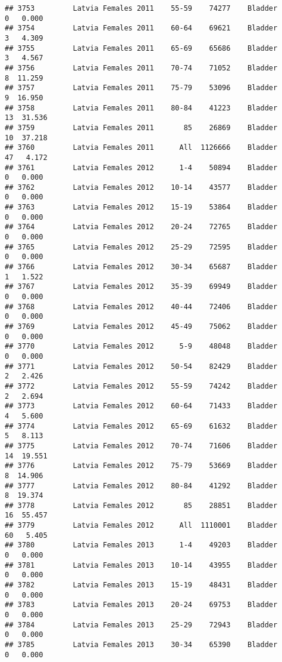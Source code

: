 \documentclass[
]{article}
\begin{document}
\begin{verbatim}
## 3753         Latvia Females 2011    55-59    74277    Bladder      0   0.000
## 3754         Latvia Females 2011    60-64    69621    Bladder      3   4.309
## 3755         Latvia Females 2011    65-69    65686    Bladder      3   4.567
## 3756         Latvia Females 2011    70-74    71052    Bladder      8  11.259
## 3757         Latvia Females 2011    75-79    53096    Bladder      9  16.950
## 3758         Latvia Females 2011    80-84    41223    Bladder     13  31.536
## 3759         Latvia Females 2011       85    26869    Bladder     10  37.218
## 3760         Latvia Females 2011      All  1126666    Bladder     47   4.172
## 3761         Latvia Females 2012      1-4    50894    Bladder      0   0.000
## 3762         Latvia Females 2012    10-14    43577    Bladder      0   0.000
## 3763         Latvia Females 2012    15-19    53864    Bladder      0   0.000
## 3764         Latvia Females 2012    20-24    72765    Bladder      0   0.000
## 3765         Latvia Females 2012    25-29    72595    Bladder      0   0.000
## 3766         Latvia Females 2012    30-34    65687    Bladder      1   1.522
## 3767         Latvia Females 2012    35-39    69949    Bladder      0   0.000
## 3768         Latvia Females 2012    40-44    72406    Bladder      0   0.000
## 3769         Latvia Females 2012    45-49    75062    Bladder      0   0.000
## 3770         Latvia Females 2012      5-9    48048    Bladder      0   0.000
## 3771         Latvia Females 2012    50-54    82429    Bladder      2   2.426
## 3772         Latvia Females 2012    55-59    74242    Bladder      2   2.694
## 3773         Latvia Females 2012    60-64    71433    Bladder      4   5.600
## 3774         Latvia Females 2012    65-69    61632    Bladder      5   8.113
## 3775         Latvia Females 2012    70-74    71606    Bladder     14  19.551
## 3776         Latvia Females 2012    75-79    53669    Bladder      8  14.906
## 3777         Latvia Females 2012    80-84    41292    Bladder      8  19.374
## 3778         Latvia Females 2012       85    28851    Bladder     16  55.457
## 3779         Latvia Females 2012      All  1110001    Bladder     60   5.405
## 3780         Latvia Females 2013      1-4    49203    Bladder      0   0.000
## 3781         Latvia Females 2013    10-14    43955    Bladder      0   0.000
## 3782         Latvia Females 2013    15-19    48431    Bladder      0   0.000
## 3783         Latvia Females 2013    20-24    69753    Bladder      0   0.000
## 3784         Latvia Females 2013    25-29    72943    Bladder      0   0.000
## 3785         Latvia Females 2013    30-34    65390    Bladder      0   0.000

\end{verbatim}
\end{document}
